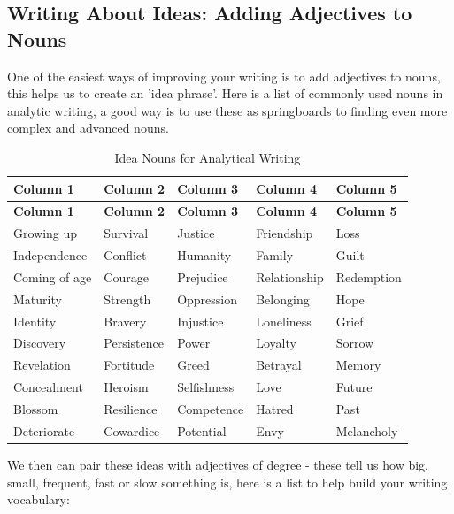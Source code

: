 \documentclass[a4paper]{article}
\begin{document}
\subsection{Writing About Ideas: Adding Adjectives to Nouns}
One of the easiest ways of improving your writing is to add adjectives to nouns, this helps us to create an 'idea phrase'. Here is a list of commonly used nouns in analytic writing, a good way is to use these as springboards to finding even more complex and advanced nouns.


\begin{longtable}{|p{2.8cm}|p{2.8cm}|p{2.8cm}|p{2.8cm}|p{2.8cm}|}
\caption{Idea Nouns for Analytical Writing} \label{tab:ideanouns} \\
\hline
\textbf{Column 1} & \textbf{Column 2} & \textbf{Column 3} & \textbf{Column 4} & \textbf{Column 5} \\
\hline
\endfirsthead

\hline
\textbf{Column 1} & \textbf{Column 2} & \textbf{Column 3} & \textbf{Column 4} & \textbf{Column 5} \\
\hline
\endhead

\hline
\endfoot

Growing up     & Survival     & Justice       & Friendship     & Loss \\
Independence   & Conflict     & Humanity      & Family         & Guilt \\
Coming of age  & Courage      & Prejudice     & Relationship   & Redemption \\
Maturity       & Strength     & Oppression    & Belonging      & Hope \\
Identity       & Bravery      & Injustice     & Loneliness     & Grief \\
Discovery      & Persistence  & Power         & Loyalty        & Sorrow \\
Revelation     & Fortitude    & Greed         & Betrayal       & Memory \\
Concealment    & Heroism      & Selfishness   & Love           & Future \\
Blossom        & Resilience   & Competence    & Hatred         & Past \\
Deteriorate    & Cowardice    & Potential     & Envy           & Melancholy \\
\hline

\end{longtable}

We then can pair these ideas with adjectives of degree - these tell us how big, small, frequent, fast or slow something is, here is a list to help build your writing vocabulary:\\
\end{document}

